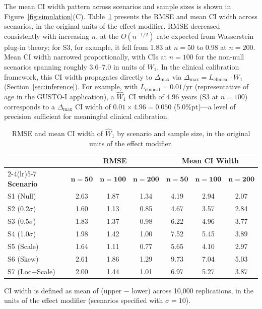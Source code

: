 \documentclass[AMA,Times1COL]{WileyNJDv5}
\begin{document}
The mean CI width pattern across scenarios and sample sizes is shown in Figure~\ref{fig:simulation}(C). Table~\ref{tab:precision} presents the RMSE and mean CI width across scenarios, in the original units of the effect modifier. RMSE decreased consistently with increasing $n$, at the $O(n^{-1/2})$ rate expected from Wasserstein plug-in theory; for S3, for example, it fell from 1.83 at $n=50$ to 0.98 at $n=200$. Mean CI width narrowed proportionally, with CIs at $n = 100$ for the non-null scenarios spanning roughly 3.6--7.0 in units of $W_1$. In the clinical calibration framework, this CI width propagates directly to $\Delta_{\max}$ via $\Delta_{\max} = L_{\text{clinical}} \cdot W_1$ (Section~\ref{sec:inference}). For example, with $L_{\text{clinical}} = 0.01$/yr (representative of age in the GUSTO-I application), a $\widehat{W}_1$ CI width of 4.96 years (S3 at $n = 100$) corresponds to a $\Delta_{\max}$ CI width of $0.01 \times 4.96 = 0.050$ (5.0\%pt)---a level of precision sufficient for meaningful clinical calibration.

\begin{table}[ht]
\centering
\caption{RMSE and mean CI width of $\widehat{W}_1$ by scenario and sample size, in the original units of the effect modifier.\label{tab:precision}}
\begin{tabular}{lcccccc}
\toprule
& \multicolumn{3}{c}{\textbf{RMSE}} & \multicolumn{3}{c}{\textbf{Mean CI Width}} \\
\cmidrule(lr){2-4}\cmidrule(lr){5-7}
\textbf{Scenario} & $\boldsymbol{n=50}$ & $\boldsymbol{n=100}$ & $\boldsymbol{n=200}$ & $\boldsymbol{n=50}$ & $\boldsymbol{n=100}$ & $\boldsymbol{n=200}$ \\
\midrule
S1 (Null) & 2.63 & 1.87 & 1.34 & 4.19 & 2.94 & 2.07 \\
S2 (0.2$\sigma$) & 1.60 & 1.13 & 0.85 & 4.67 & 3.57 & 2.84 \\
S3 (0.5$\sigma$) & 1.83 & 1.37 & 0.98 & 6.22 & 4.96 & 3.77 \\
S4 (1.0$\sigma$) & 1.98 & 1.42 & 1.00 & 7.52 & 5.45 & 3.89 \\
S5 (Scale) & 1.64 & 1.11 & 0.77 & 5.65 & 4.10 & 2.97 \\
S6 (Skew) & 2.61 & 1.86 & 1.29 & 9.73 & 7.04 & 5.03 \\
S7 (Loc+Scale) & 2.00 & 1.44 & 1.01 & 6.97 & 5.27 & 3.87 \\
\bottomrule
\end{tabular}
\begin{tablenotes}
\item CI width is defined as mean of (upper $-$ lower) across 10{,}000 replications, in the units of the effect modifier (scenarios specified with $\sigma = 10$).
\end{tablenotes}
\end{table}
\end{document}
